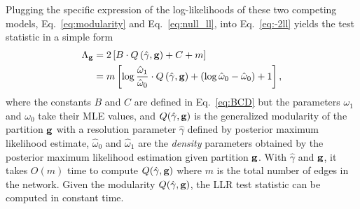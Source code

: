 Plugging the specific expression of the log-likelihoods of these two competing models, Eq.~\ref{eq:modularity} and Eq.~\ref{eq:null_ll}, into Eq.~\ref{eq:-2ll} yields the test statistic in a simple form
\begin{equation} 
    \begin{split}
    \Lambda_{\bf g} &= 2 \left[ B \cdot Q \left(\hat{\gamma}, {\bf g} \right) + C + m \right] \\
        &= m \left[\log \frac{\hat{\omega}_1}{\hat{\omega}_0} \cdot Q \left(\hat{\gamma}, {\bf g} \right) + \left(\log \hat{\omega}_0 - \hat{\omega}_0 \right) + 1 \right],
    \end{split}
\end{equation}
where the constants $B$ and $C$ are defined in Eq.~\ref{eq:BCD} but the parameters $\omega_1$ and $\omega_0$ take their MLE values, and $Q(\hat{\gamma}, {\bf g})$ is the generalized modularity of the partition $\bf g$ with a resolution parameter $\hat{\gamma}$ defined by posterior maximum likelihood estimate, $\hat{\omega}_0$ and $\hat{\omega}_1$ are the {\it density} parameters obtained by the posterior maximum likelihood estimation given partition $\bf g$. With $\hat{\gamma}$ and ${\bf g}$, it takes $O(m)$ time to compute $Q(\hat{\gamma}, {\bf g})$ where $m$ is the total number of edges in the network. Given the modularity $Q(\hat{\gamma}, {\bf g})$, the LLR test statistic can be computed in constant time.

